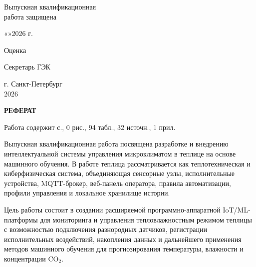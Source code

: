 \documentclass[a4paper,14pt]{extarticle}
\newcommand{\VkrStructuralSectionNoToc}[1]{%
  \begin{center}\bfseries #1\end{center}%
  \par\nopagebreak\vspace{12pt}%
}
\begin{document}
\begin{titlepage}
\vspace{0.4cm}

\begin{flushright}
\begin{minipage}{0.46\textwidth}
Выпускная квалификационная\\
работа защищена

\vspace{0.15cm}

«\underline{\hspace{0.8cm}}»\underline{\hspace{2.5cm}}2026 г.

\vspace{0.18cm}

Оценка

\vspace{0.12cm}

\underline{\hspace{3.0cm}}

\vspace{0.18cm}

Секретарь ГЭК \underline{\hspace{2.2cm}}
\end{minipage}
\end{flushright}

\vfill

\begin{center}
г. Санкт-Петербург\\
2026
\end{center}
\end{titlepage}

\setcounter{page}{2}
\hypersetup{pageanchor=true}

\VkrStructuralSectionNoToc{РЕФЕРАТ}\label{ux440ux435ux444ux435ux440ux430ux442}

Работа содержит \pageref{LastPage} с., 0 рис., 94 табл., 32 источн., 1
прил.

Выпускная квалификационная работа посвящена разработке и внедрению
интеллектуальной системы управления микроклиматом в теплице на основе
машинного обучения. В работе теплица рассматривается как
теплотехническая и киберфизическая система, объединяющая сенсорные узлы,
исполнительные устройства, MQTT-брокер, веб-панель оператора, правила
автоматизации, профили управления и локальное хранилище истории.

Цель работы состоит в создании расширяемой программно-аппаратной
IoT/ML-платформы для мониторинга и управления тепловлажностным режимом
теплицы с возможностью подключения разнородных датчиков, регистрации
исполнительных воздействий, накопления данных и дальнейшего применения
методов машинного обучения для прогнозирования температуры, влажности и
концентрации CO\(_2\).
\end{document}
